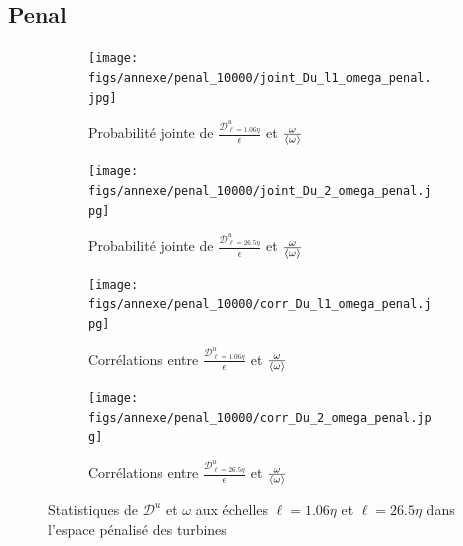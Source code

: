 \documentclass[13pt, a4paper]{extarticle}
\begin{document}
\subsection{Penal}
\begin{figure}[H]
  \centering
  \begin{subfigure}[b]{0.48\linewidth}
  \centering
  \texttt{[image: figs/annexe/penal\_10000/joint\_Du\_l1\_omega\_penal.jpg]}
  \caption{Probabilité jointe de $\frac{\mathscr{D}^u_{\ell=1.06\eta}}{\epsilon}$ et 
  $\frac{\omega}{\left\langle \omega\right\rangle}$}
  \end{subfigure}
  \begin{subfigure}[b]{0.48\linewidth}
    \centering
    \texttt{[image: figs/annexe/penal\_10000/joint\_Du\_2\_omega\_penal.jpg]}
    \caption{Probabilité jointe de $\frac{\mathscr{D}^u_{\ell=26.5\eta}}{\epsilon}$ et 
    $\frac{\omega}{\left\langle \omega\right\rangle}$}
    \end{subfigure}
    \begin{subfigure}[b]{0.48\linewidth}
      \centering
      \texttt{[image: figs/annexe/penal\_10000/corr\_Du\_l1\_omega\_penal.jpg]}
      \caption{Corrélations entre $\frac{\mathscr{D}^u_{\ell=1.06\eta}}{\epsilon}$ et 
      $\frac{\omega}{\left\langle \omega\right\rangle}$}
      \end{subfigure}
      \begin{subfigure}[b]{0.48\linewidth}
        \centering
        \texttt{[image: figs/annexe/penal\_10000/corr\_Du\_2\_omega\_penal.jpg]}
        \caption{Corrélations entre $\frac{\mathscr{D}^u_{\ell=26.5\eta}}{\epsilon}$ et 
        $\frac{\omega}{\left\langle \omega\right\rangle}$}
        \end{subfigure}
  \caption{Statistiques de $\mathscr{D}^u$ et $\omega$ aux échelles $\ell=1.06\eta$ et 
  $\ell=26.5\eta$ dans l'espace pénalisé des turbines}
  \label{fig:du_omega}
\end{figure}
\end{document}
